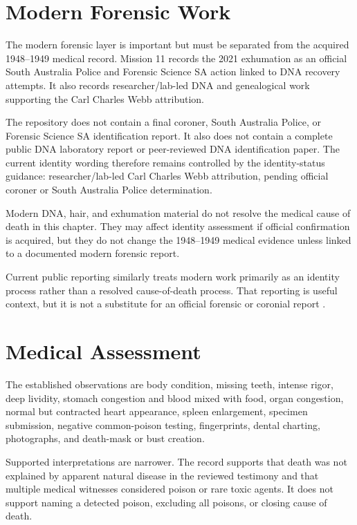 \section{Modern Forensic Work}

The modern forensic layer is important but must be separated from the acquired 1948--1949 medical record. Mission 11 records the 2021 exhumation as an official South Australia Police and Forensic Science SA action linked to DNA recovery attempts. It also records researcher/lab-led DNA and genealogical work supporting the Carl Charles Webb attribution.

The repository does not contain a final coroner, South Australia Police, or Forensic Science SA identification report. It also does not contain a complete public DNA laboratory report or peer-reviewed DNA identification paper. The current identity wording therefore remains controlled by the identity-status guidance: researcher/lab-led Carl Charles Webb attribution, pending official coroner or South Australia Police determination.

Modern DNA, hair, and exhumation material do not resolve the medical cause of death in this chapter. They may affect identity assessment if official confirmation is acquired, but they do not change the 1948--1949 medical evidence unless linked to a documented modern forensic report.

Current public reporting similarly treats modern work primarily as an identity process rather than a resolved cause-of-death process. That reporting is useful context, but it is not a substitute for an official forensic or coronial report \parencite{m11-m11-src-0001}.

\section{Medical Assessment}

The established observations are body condition, missing teeth, intense rigor, deep lividity, stomach congestion and blood mixed with food, organ congestion, normal but contracted heart appearance, spleen enlargement, specimen submission, negative common-poison testing, fingerprints, dental charting, photographs, and death-mask or bust creation.

Supported interpretations are narrower. The record supports that death was not explained by apparent natural disease in the reviewed testimony and that multiple medical witnesses considered poison or rare toxic agents. It does not support naming a detected poison, excluding all poisons, or closing cause of death.

